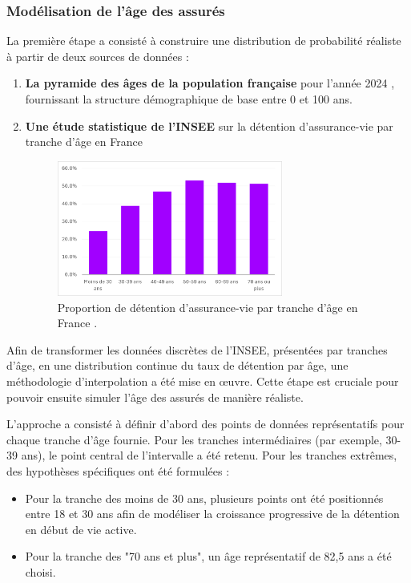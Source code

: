 \subsubsection{Modélisation de l'âge des assurés}

La première étape a consisté à construire une distribution de probabilité réaliste à partir de deux sources de données :
\begin{enumerate}
\item \textbf{La pyramide des âges de la population française} pour l'année 2024 \cite{pyramide_age}, fournissant la structure démographique de base entre 0 et 100 ans.

\item \textbf{Une étude statistique de l'INSEE} sur la détention d'assurance-vie par tranche d'âge en France \cite{insee_prop_av_age}
\begin{figure}[H]
\centering
\includegraphics[width=0.7\textwidth]{images/2_chapitres/chapitre3/insee_prop_av_age.png}
\caption{Proportion de détention d'assurance-vie par tranche d'âge en France \cite{insee_prop_av_age}.}
\label{fig:insee_prop_av_age}
\end{figure}
\end{enumerate}
Afin de transformer les données discrètes de l'INSEE, présentées par tranches d'âge, en une distribution continue du taux de détention par âge, une méthodologie d'interpolation a été mise en œuvre. Cette étape est cruciale pour pouvoir ensuite simuler l'âge des assurés de manière réaliste.

L'approche a consisté à définir d'abord des points de données représentatifs pour chaque tranche d'âge fournie. Pour les tranches intermédiaires (par exemple, 30-39 ans), le point central de l'intervalle a été retenu. Pour les tranches extrêmes, des hypothèses spécifiques ont été formulées :
\begin{itemize}
    \item Pour la tranche des moins de 30 ans, plusieurs points ont été positionnés entre 18 et 30 ans afin de modéliser la croissance progressive de la détention en début de vie active.
    \item Pour la tranche des "70 ans et plus", un âge représentatif de 82,5 ans a été choisi.
\end{itemize}

